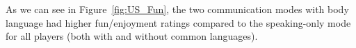 As we can see in Figure~\ref{fig:US_Fun}, the two communication modes with body language had higher fun/enjoyment ratings compared to the speaking-only mode for all players (both with and without common languages). 







